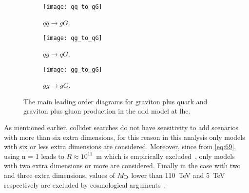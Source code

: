\begin{figure}[!htb]
  \centering
  \begin{subfigure}{.48\linewidth}
    \texttt{[image: qq\_to\_gG]}
    \caption{$q \bar{q} \rightarrow g G$.}
  \end{subfigure}
  \begin{subfigure}{.48\linewidth}
    \texttt{[image: qg\_to\_qG]}
    \caption{$q g \rightarrow q G$.}
  \end{subfigure}
  \begin{subfigure}{.48\linewidth}
    \texttt{[image: gg\_to\_gG]}
    \caption{$g g \rightarrow g G$.}
  \end{subfigure}
  \caption{The main leading order diagrams for graviton plus quark and graviton
    plus gluon production in the \gls{add} model at \gls{lhc}.}
  \label{fig:add_feynman}
\end{figure}

As mentioned earlier, collider searches do not have sensitivity to \gls{add}
scenarios with more than six extra dimensions, for this reason in this analysis
only models with six or less extra dimensions are considered. Moreover, since
from \cref{eq:69}, using n = 1 leads to $R \approx 10^{11}$~m which is
empirically excluded~\cite{ADDPhenomenology}, only models with two extra
dimensions or more are considered. Finally in the case with two and three extra
dimensions, values of $M_\mathrm{D}$ lower than 110~TeV and 5~TeV respectively are
excluded by cosmological arguments~\cite{ADDCosmology}.

